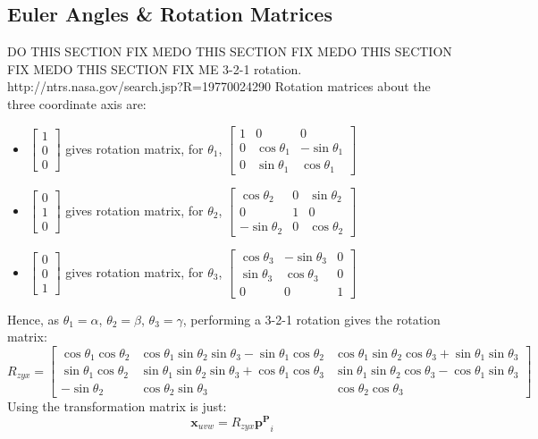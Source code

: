 \documentclass[]{article}
\newcommand\vect[1]{\bm{#1}} %
\begin{document}
\subsection{Euler Angles \& Rotation Matrices}
\par
	DO THIS SECTION FIX MEDO THIS SECTION FIX MEDO THIS SECTION FIX MEDO THIS SECTION FIX ME
	3-2-1 rotation. http://ntrs.nasa.gov/search.jsp?R=19770024290
	Rotation matrices about the three coordinate axis are:
	\begin{itemize}
		\item $\begin{bmatrix}
			1 \\ 
			0 \\ 
			0
		\end{bmatrix}$ gives rotation matrix, for $\theta_1$, $\begin{bmatrix}
		1 & 0 & 0 \\ 
		0 & \cos{\theta_1} & -\sin{\theta_1} \\ 
		0 & \sin{\theta_1} & \cos{\theta_1}
		\end{bmatrix} $
		\item $\begin{bmatrix}
			0 \\ 
			1 \\ 
			0
		\end{bmatrix}$ gives rotation matrix, for $\theta_2$, $\begin{bmatrix}
		\cos{\theta_2} & 0 & \sin{\theta_2} \\ 
		0 & 1 & 0 \\ 
		-\sin{\theta_2} & 0 & \cos{\theta_2}
		\end{bmatrix} $
		\item $\begin{bmatrix}
			0 \\ 
			0 \\ 
			1
		\end{bmatrix}$ gives rotation matrix, for $\theta_3$, $\begin{bmatrix}
		\cos{\theta_3} & -\sin{\theta_3} & 0 \\ 
		\sin{\theta_3} & \cos{\theta_3} & 0 \\ 
		0 & 0 & 1
		\end{bmatrix}  $
	\end{itemize}
	
\par
	Hence, as $\theta_1 = \alpha$, $\theta_2 = \beta$, $\theta_3 = \gamma$, performing a 3-2-1 rotation gives the rotation matrix:
	$$
	R_{zyx} = \begin{bmatrix}
	\cos{\theta_1}\cos{\theta_2} & \cos{\theta_1}\sin{\theta_2}\sin{\theta_3} - \sin{\theta_1}\cos{\theta_2} & \cos{\theta_1}\sin{\theta_2}\cos{\theta_3} + \sin{\theta_1}\sin{\theta_3} \\ 
	\sin{\theta_1}\cos{\theta_2} & \sin{\theta_1}\sin{\theta_2}\sin{\theta_3}+\cos{\theta_1}\cos{\theta_3} & \sin{\theta_1}\sin{\theta_2}\cos{\theta_3}-\cos{\theta_1}\sin{\theta_3} \\ 
	-\sin{\theta_2} & \cos{\theta_2}\sin{\theta_3} & \cos{\theta_2}\cos{\theta_3}
	\end{bmatrix} 
	$$
	Using the transformation matrix is just:
	$$\vect{x}_{uvw} = R_{zyx}\vect{p^P}_i$$
	
\end{document}
